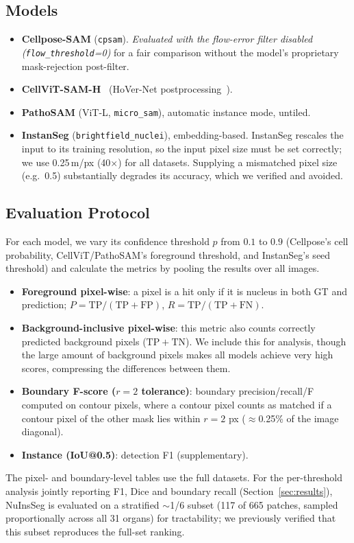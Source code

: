 \documentclass[10pt,conference]{IEEEtran}
\begin{document}
\subsection{Models}
\label{sec:models}
\begin{itemize}
  \item \textbf{Cellpose-SAM} (\texttt{cpsam}). \emph{Evaluated with the flow-error
        filter disabled (\texttt{flow\_threshold}=0)} for a fair comparison without
        the model's proprietary mask-rejection post-filter.
  \item \textbf{CellViT-SAM-H}~\cite{cellvit} (HoVer-Net postprocessing~\cite{hovernet}).
  \item \textbf{PathoSAM} (ViT-L, \texttt{micro\_sam}), automatic instance mode, untiled.
  \item \textbf{InstanSeg} (\texttt{brightfield\_nuclei}), embedding-based. InstanSeg
        rescales the input to its training resolution, so the input pixel size must
        be set correctly; we use 0.25\,\textmu m/px (40$\times$) for all datasets.
        Supplying a mismatched pixel size (e.g.\ 0.5) substantially degrades its
        accuracy, which we verified and avoided.
\end{itemize}

\subsection{Evaluation Protocol}
\label{sec:metrics}
For each model, we vary its confidence threshold $p$ from $0.1$ to $0.9$ (Cellpose's cell probability,
CellViT/PathoSAM's foreground threshold, and InstanSeg's seed threshold) and calculate the metrics
by pooling the results over all images.
\begin{itemize}
  \item \textbf{Foreground pixel-wise}: a pixel is a hit only if it is
        nucleus in both GT and prediction;
        $P=\mathrm{TP}/(\mathrm{TP{+}FP})$, $R=\mathrm{TP}/(\mathrm{TP{+}FN})$.
  \item \textbf{Background-inclusive pixel-wise}: this metric also counts correctly
        predicted background pixels ($\mathrm{TP{+}TN}$). We include this for analysis, though the
        large amount of background pixels makes all models achieve very high scores, compressing the
        differences between them.
  \item \textbf{Boundary F-score ($r{=}2$ tolerance)}: boundary
        precision/recall/F computed on contour pixels, where a contour pixel
        counts as matched if a contour pixel of the other mask lies within
        $r{=}2$ px ($\approx$0.25\% of the image diagonal).
  \item \textbf{Instance (IoU@0.5)}: detection F1 (supplementary).
\end{itemize}
The pixel- and boundary-level tables use the full datasets. For the per-threshold
analysis jointly reporting F1, Dice and boundary recall (Section~\ref{sec:results}),
NuInsSeg is evaluated on a stratified $\sim$1/6 subset (117 of 665 patches, sampled
proportionally across all 31 organs) for tractability; we previously verified that
this subset reproduces the full-set ranking.
\end{document}
